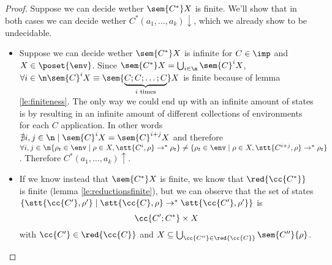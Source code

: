 \begin{proof}
  Suppose we can decide wether \(\sem{C^*}X\) is finite. We'll show
  that in both cases we can decide wether \(C^*(a_1, \dots,
  a_k)\downarrow\), which we already show to be undecidable.
  \begin{itemize}
  \item Suppose we can decide wether \(\sem{C^*}X\) is infinite for
    \(C\in\imp\) and \(X\in\poset{\env}\). Since \(\sem{C^*}X =
    \bigcup_{i\in\n}\sem{C}^i X\), \(\forall i \in \n \sem{C}^i X
    \equiv \sem{\underbrace{C;C;\dots;C}_{i\text{ times}}}X\) is
    finite because of lemma \ref{le:finiteness}. The only way we could
    end up with an infinite amount of states is by resulting in an
    infinite amount of different collections of environments for each
    \(C\) application. In other words \(\nexists i,j \in \n \mid
    \sem{C}^i X = \sem{C}^{i+j}X\) and therefore \(\forall i,j\in\n
    \{\rho_t \in \env \mid \rho \in X , \stt{C^i, \rho} \to^* \rho_t\}
    \neq \{\rho_t \in \env \mid \rho \in X , \stt{C^{i+j}, \rho} \to^*
    \rho_t\}\). Therefore \(C^*(a_1, \dots, a_k)\uparrow\).
  \item If we know instead that \(\sem{C^*}X\) is finite, we know that
    \(\red{\cc{C^*}}\) is finite (lemma \ref{le:reductionsfinite}),
    but we can observe that the set of states \(\{\stt{\cc{C'}, \rho'}
    \mid \stt{\cc{C}, \rho} \to^* \stt{\cc{C'}, \rho'}\}\)
    is \[\cc{C';C^*} \times X\] with \(\cc{C'}\in\red{\cc{C}}\) and
    \(X \subseteq \bigcup_{\cc{C''}\in\red{\cc{C}}} \sem{C''} \{\rho\}
    \).
  \end{itemize}
\end{proof}

